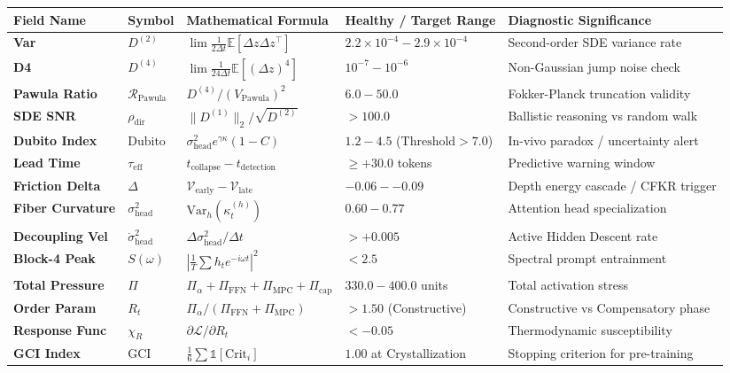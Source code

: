 \documentclass[10pt,a4paper]{article}
\begin{document}
\begin{center}
\small
\begin{longtable}{p{2.2cm} p{1.2cm} p{3.8cm} p{3.2cm} p{3.5cm}}
\toprule
\textbf{Field Name} & \textbf{Symbol} & \textbf{Mathematical Formula} & \textbf{Healthy / Target Range} & \textbf{Diagnostic Significance} \\
\midrule
\endhead
\textbf{Var} & $D^{(2)}$ & $\lim \frac{1}{2\Delta t} \mathbb{E}[\Delta z \Delta z^\top]$ & $2.2 \times 10^{-4} - 2.9 \times 10^{-4}$ & Second-order SDE variance rate \\
\textbf{D4} & $D^{(4)}$ & $\lim \frac{1}{24\Delta t} \mathbb{E}[(\Delta z)^4]$ & $10^{-7} - 10^{-6}$ & Non-Gaussian jump noise check \\
\textbf{Pawula Ratio} & $\mathcal{R}_{\text{Pawula}}$ & $D^{(4)} / (V_{\text{Pawula}})^2$ & $6.0 - 50.0$ & Fokker-Planck truncation validity \\
\textbf{SDE SNR} & $\rho_{\text{dir}}$ & $\|D^{(1)}\|_2 / \sqrt{D^{(2)}}$ & $> 100.0$ & Ballistic reasoning vs random walk \\
\textbf{Dubito Index} & $\text{Dubito}$ & $\sigma_{\text{head}}^2 e^{\gamma \kappa} (1-C)$ & $1.2 - 4.5$ ($\text{Threshold} > 7.0$) & In-vivo paradox / uncertainty alert \\
\textbf{Lead Time} & $\tau_{\text{eff}}$ & $t_{\text{collapse}} - t_{\text{detection}}$ & $\ge +30.0$ tokens & Predictive warning window \\
\textbf{Friction Delta} & $\Delta$ & $\mathcal{V}_{\text{early}} - \mathcal{V}_{\text{late}}$ & $-0.06 - -0.09$ & Depth energy cascade / CFKR trigger \\
\textbf{Fiber Curvature} & $\sigma^2_{\text{head}}$ & $\text{Var}_h(\kappa_t^{(h)})$ & $0.60 - 0.77$ & Attention head specialization \\
\textbf{Decoupling Vel} & $\dot{\sigma}^2_{\text{head}}$ & $\Delta \sigma^2_{\text{head}} / \Delta t$ & $> +0.005$ & Active Hidden Descent rate \\
\textbf{Block-4 Peak} & $S(\omega)$ & $|\frac{1}{T} \sum h_t e^{-i\omega t}|^2$ & $< 2.5$ & Spectral prompt entrainment \\
\textbf{Total Pressure} & $\Pi$ & $\Pi_\alpha + \Pi_{\text{FFN}} + \Pi_{\text{MPC}} + \Pi_{\text{cap}}$ & $330.0 - 400.0$ units & Total activation stress \\
\textbf{Order Param} & $R_t$ & $\Pi_\alpha / (\Pi_{\text{FFN}} + \Pi_{\text{MPC}})$ & $> 1.50$ (Constructive) & Constructive vs Compensatory phase \\
\textbf{Response Func} & $\chi_R$ & $\partial \mathcal{L} / \partial R_t$ & $< -0.05$ & Thermodynamic susceptibility \\
\textbf{GCI Index} & $\text{GCI}$ & $\frac{1}{6} \sum \mathbb{1}[\text{Crit}_i]$ & $1.00$ at Crystallization & Stopping criterion for pre-training \\
\bottomrule
\end{longtable}
\end{center}
\end{document}
